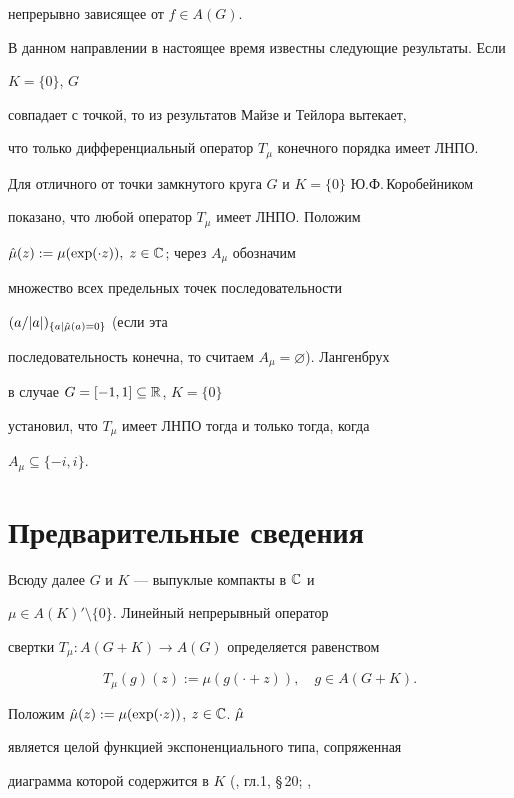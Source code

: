 непрерывно зависящее от $f\in A(G)$. 


 


В данном направлении в настоящее время известны следующие результаты. Если 


$K=\{0\}$, $G$


совпадает с точкой, то из результатов Майзе и Тейлора \cite{Mei1} вытекает, 


что только дифференциальный оператор $T_\mu$ конечного порядка имеет ЛНПО. 


Для отличного от точки замкнутого круга $G$ и $K=\{0\}$ Ю.Ф.\,Коробейником 


\cite{Kor2} показано, что любой оператор $T_\mu$ имеет ЛНПО. Положим 


$\Hat\mu(z):=\mu(\exp(\cdot z)),\;z\in\Bbb C$; через $A_\mu$ обозначим 


множество всех предельных точек последовательности 


$(a/|a|)_{\{a\mid\Hat\mu(a)=0\}}$ (если эта 


последовательность конечна, то считаем $A_\mu=\varnothing$). Лангенбрух 


\cite{Lang1} в случае $G=[-1,1]\subseteq\Bbb R$, $K=\{0\}$ 


установил, что $T_\mu$ имеет ЛНПО тогда и только тогда, когда 


$A_\mu\subseteq\{-i,i\}$. 


 


\section{Предварительные сведения} 


 


Всюду далее $G$ и $K$ --- выпуклые компакты в $\Bbb C$ и 


$\mu\in A(K)'\setminus\{0\}$. Линейный непрерывный оператор 


свертки $T_\mu :A(G+K)\to A(G)$ определяется равенством 


$$ 


T_\mu (g)(z):=\mu(g(\cdot +z)),\quad g\in A(G+K). 


$$ 


Положим $\Hat\mu(z):=\mu(\exp(\cdot z))$, $z\in\Bbb C$. $\Hat\mu$ 


является целой функцией экспоненциального типа, сопряженная 


диаграмма которой содержится в $K$ (\cite{Lev}, гл.1, \S\,20; \cite{Her}, 


